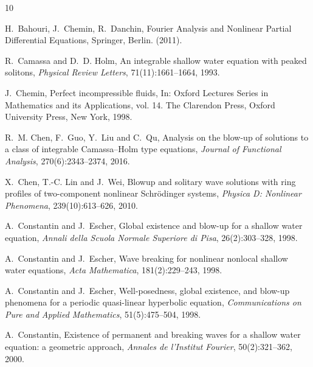 \documentclass[11pt]{article}
\begin{document}
\begin{thebibliography}{10}


H.~Bahouri, J.~Chemin, R.~Danchin,  
\newblock  Fourier Analysis and Nonlinear Partial Differential Equations,
\newblock  Springer, Berlin. (2011).

R.~Camassa and D.~D. Holm,
\newblock An integrable shallow water equation with peaked solitons,
\newblock \emph{Physical Review Letters}, 71(11):1661--1664, 1993.

J.~Chemin, 
\newblock Perfect incompressible fluids,
\newblock In: Oxford Lectures Series in Mathematics and its Applications, vol. 14. The Clarendon Press, Oxford University Press, New York, 1998.

R.~M. Chen, F.~Guo, Y.~Liu and C.~Qu,
\newblock Analysis on the blow-up of solutions to a class of integrable Camassa--Holm type equations,
\newblock \emph{Journal of Functional Analysis}, 270(6):2343--2374, 2016.

X.~Chen, T.-C. Lin and J.~Wei,
\newblock Blowup and solitary wave solutions with ring profiles of two-component nonlinear Schr\"odinger systems,
\newblock \emph{Physica D: Nonlinear Phenomena}, 239(10):613--626, 2010.

A.~Constantin and J.~Escher,
\newblock Global existence and blow-up for a shallow water equation,
\newblock \emph{Annali della Scuola Normale Superiore di Pisa}, 26(2):303--328, 1998.

A.~Constantin and J.~Escher,
\newblock Wave breaking for nonlinear nonlocal shallow water equations,
\newblock \emph{Acta Mathematica}, 181(2):229--243, 1998.

A.~Constantin and J.~Escher,
\newblock Well-posedness, global existence, and blow-up phenomena for a periodic quasi-linear hyperbolic equation,
\newblock \emph{Communications on Pure and Applied Mathematics}, 51(5):475--504, 1998.

A.~Constantin,
\newblock Existence of permanent and breaking waves for a shallow water equation: a geometric approach,
\newblock \emph{Annales de l'Institut Fourier}, 50(2):321--362, 2000.


\end{thebibliography}
\end{document}
